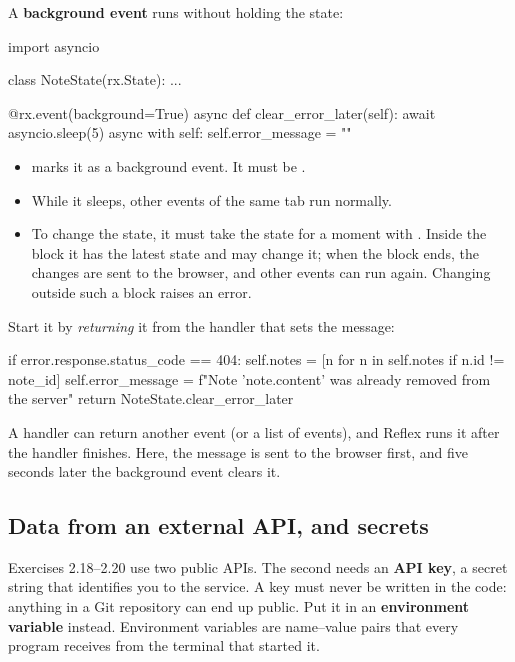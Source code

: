 A \textbf{background event} runs without holding the state:

\begin{py}
import asyncio


class NoteState(rx.State):
	...

	@rx.event(background=True)
	async def clear_error_later(self):
		await asyncio.sleep(5)
		async with self:
			self.error_message = ""
\end{py}

\begin{itemize}
\item {} marks it as a background event. It must be .
\item While it sleeps, other events of the same tab run normally.
\item To change the state, it must take the state for a moment with . Inside the block it has the latest state and may change it; when the block ends, the changes are sent to the browser, and other events can run again. Changing  outside such a block raises an error.
\end{itemize}

Start it by \emph{returning} it from the handler that sets the message:

\begin{py}
if error.response.status_code == 404:
	self.notes = [n for n in self.notes if n.id != note_id]
	self.error_message = f"Note '{note.content}' was already removed from the server"
	return NoteState.clear_error_later
\end{py}

A handler can return another event (or a list of events), and Reflex runs it after the handler finishes. Here, the message is sent to the browser first, and five seconds later the background event clears it.

\subsection{Data from an external API, and secrets}

Exercises 2.18--2.20 use two public APIs. The second needs an \textbf{API key}, a secret string that identifies you to the service. A key must never be written in the code: anything in a Git repository can end up public. Put it in an \textbf{environment variable} instead. Environment variables are name--value pairs that every program receives from the terminal that started it.

